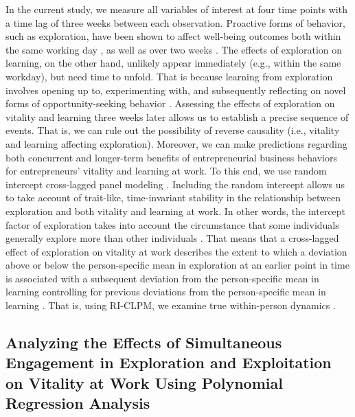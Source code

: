 \documentclass[man, 12pt, a4paper, noextraspace]{apa6}
\begin{document}
In the current study, we measure all variables of interest at four time points with a time lag of three weeks between each observation.  
Proactive forms of behavior, such as exploration, have been shown to affect well-being outcomes both within the same working day \parencite{Niessen.2012}, as well as over two weeks \parencite{Strauss.2017}. 
The effects of exploration on learning, on the other hand, unlikely appear immediately (e.g., within the same workday), but need time to unfold. 
That is because learning from exploration involves opening up to, experimenting with, and subsequently reflecting on novel forms of opportunity-seeking behavior \parencite{Holcomb2009}. 
Assessing the effects of exploration on vitality and learning three weeks later allows us to establish a precise sequence of events. 
That is, we can rule out the possibility of reverse causality (i.e., vitality and learning affecting exploration). 
Moreover, we can make predictions regarding both concurrent and longer-term benefits of entrepreneurial business behaviors for entrepreneurs' vitality and learning at work. 
To this end, we use random intercept cross-lagged panel modeling \parencite[RI-CLPM;][]{Hamaker.2015}.  
Including the random intercept allows us to take account of trait-like, time-invariant stability in the relationship between exploration and both vitality and learning at work.
In other words, the intercept factor of exploration takes into account the circumstance that some individuals generally explore more than other individuals \parencite{Mund2019}.
That means that a cross-lagged effect of exploration on vitality at work describes the extent to which a deviation above or below the person-specific mean in exploration at an earlier point in time is associated with a subsequent deviation from the person-specific mean in learning controlling for previous deviations from the person-specific mean in learning \parencite{Hamaker.2015, Mund2019}. 
That is, using RI-CLPM, we examine true within-person dynamics \parencite{Hamaker.2015}. 

\subsection{Analyzing the Effects of Simultaneous Engagement in Exploration and Exploitation on Vitality at Work Using Polynomial Regression Analysis}
\end{document}
